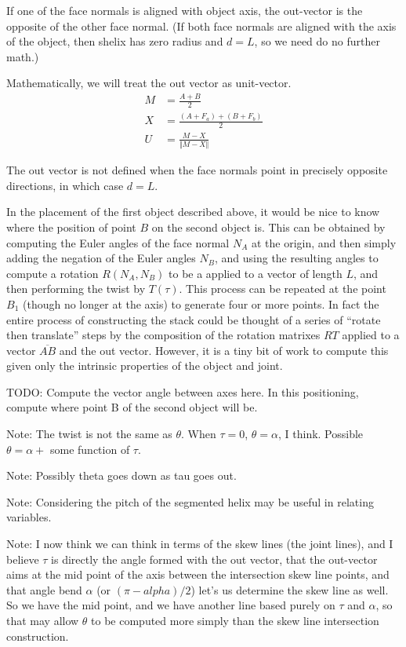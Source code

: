 \documentclass[11pt]{article}
\begin{document}
{If one of the face normals is aligned with object axis, the out-vector is the opposite
of the other face normal. (If both face normals are aligned with the axis of the object,
then shelix has zero radius and $d = L$, so we need do no further math.)

Mathematically, we will treat the out vector as unit-vector.
\begin{align}
  M &= \frac{A+B}{2} \\
  X &= \frac{(A+F_a) + (B+F_b)}{2} \\
  U &= \frac{M - X}{\Vert M - X \Vert}
\end{align}

The out vector is not defined when the face normals point in precisely opposite directions,
in which case $d = L$.

In the placement of the first object described above, it would
be nice to know where the position of point $B$ on the second
object is. This can be obtained by computing the Euler angles
of the face normal $N_A$ at the origin, and then simply
adding the negation of the Euler angles $N_B$, and using
the resulting angles to compute a rotation $R(N_A,N_B)$ to be a applied to
a vector of length $L$, and then performing the twist by $T(\tau)$. This process can be repeated at
the point $B_1$ (though no longer at the axis) to generate
four or more points. In fact the entire process of constructing
the stack could be thought of a series of ``rotate then translate'' steps by the composition of the rotation matrixes $RT$ applied to a vector $\overline{AB}$ and the out vector.
However, it is a tiny bit of work to compute this given only
the intrinsic properties of the object and joint.

TODO: Compute the vector angle between axes here. In this positioning, compute where
point B of the second object will be.

Note: The twist is not the same as $\theta$. When $\tau = 0$, $\theta = \alpha$,
I think. Possible $\theta = \alpha + $ some function of $\tau$.

Note: Possibly theta goes down as tau goes out.

Note: Considering the pitch of the segmented helix may be useful
in relating variables.

Note: I now think we can think in terms of the skew lines (the
joint lines), and I believe $\tau$ is directly the angle
formed with the out vector, that the out-vector aims at
the mid point of the axis between the intersection skew line
points, and that angle bend $\alpha$ (or $(\pi - alpha)/2$)
let's us determine the skew line as well.  So we have
the mid point, and we have another line based purely
on $\tau$ and $\alpha$, so that may allow $\theta$
to be computed more simply than the skew line intersection
construction.

}
\end{document}
